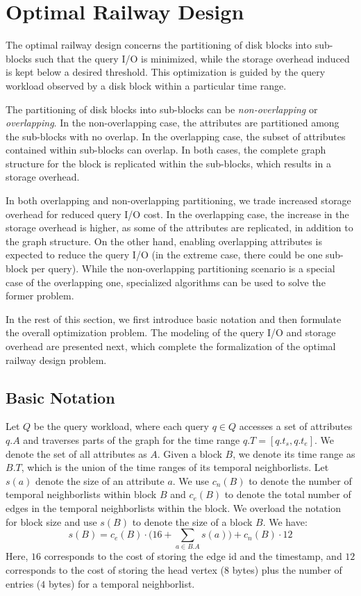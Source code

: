 \section{Optimal Railway Design}\label{sec:optimal}  
\noindent
The optimal railway design concerns the partitioning of disk blocks into
sub-blocks such that the query I/O is minimized, while the storage overhead
induced is kept below a desired threshold. This optimization is guided by the
query workload observed by a disk block within a particular time range.

The partitioning of disk blocks into sub-blocks can be \emph{non-overlapping}
or \emph{overlapping}. In the non-overlapping case, the attributes are
partitioned among the sub-blocks with no overlap. In the overlapping case, the
subset of attributes contained within sub-blocks can overlap. In both cases,
the complete graph structure for the block is replicated within the
sub-blocks, which results in a storage overhead.

In both overlapping and non-overlapping partitioning, we trade increased
storage overhead for reduced query I/O cost. In the overlapping case, the
increase in the storage overhead is higher, as some of the attributes are
replicated, in addition to the graph structure. On the other hand, enabling
overlapping attributes is expected to reduce the query I/O (in the extreme
case, there could be one sub-block per query). While the non-overlapping
partitioning scenario is a special case of the  overlapping one, specialized
algorithms can be used to solve the former problem.

In the rest of this section, we first introduce basic notation and then
formulate the overall optimization problem. The modeling of the query I/O and
storage overhead are presented next, which complete the formalization of the
optimal railway design problem.

\subsection{Basic Notation}
\noindent
Let $Q$ be the query workload, where each query $q\in Q$ accesses a set of
attributes $q.A$ and traverses parts of the graph for the time range
$q.T=[q.t_s,q.t_e]$. We denote the set of all attributes as $A$. Given a block
$B$, we denote its time range as $B.T$, which is the union of the time ranges
of its temporal neighborlists. Let $s(a)$ denote the size of an attribute $a$.
We use $c_n(B)$ to denote the number of temporal neighborlists within block
$B$ and $c_e(B)$ to denote the total number of edges in the temporal
neighborlists within the block. We overload the notation for block size and
use $s(B)$ to denote the size of a block $B$. We have: 
\begin{equation}
s(B) = c_e(B) \cdot \Big(16 + \sum_{a\in B.A} s(a)\Big) + c_n(B) \cdot 12  
\end{equation}
Here, $16$ corresponds to the cost of storing the edge id and the timestamp,
and $12$ corresponds to the cost of storing the head vertex ($8$ bytes) plus
the number of entries ($4$ bytes) for a temporal neighborlist. 

